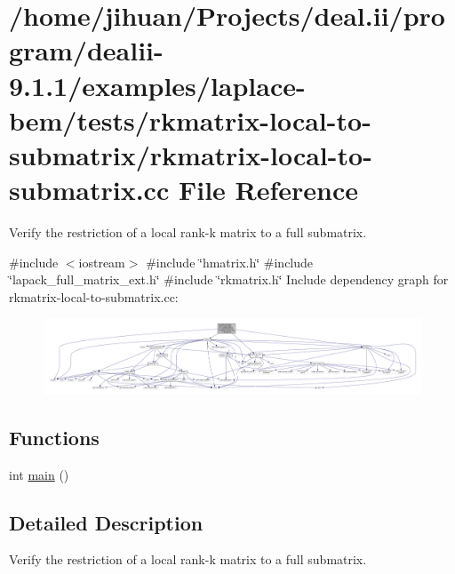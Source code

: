 \hypertarget{rkmatrix-local-to-submatrix_8cc}{}\section{/home/jihuan/\+Projects/deal.ii/program/dealii-\/9.1.1/examples/laplace-\/bem/tests/rkmatrix-\/local-\/to-\/submatrix/rkmatrix-\/local-\/to-\/submatrix.cc File Reference}
\label{rkmatrix-local-to-submatrix_8cc}


Verify the restriction of a local rank-\/k matrix to a full submatrix.  


{\ttfamily \#include $<$iostream$>$}\newline
{\ttfamily \#include \char`\"{}hmatrix.\+h\char`\"{}}\newline
{\ttfamily \#include \char`\"{}lapack\+\_\+full\+\_\+matrix\+\_\+ext.\+h\char`\"{}}\newline
{\ttfamily \#include \char`\"{}rkmatrix.\+h\char`\"{}}\newline
Include dependency graph for rkmatrix-\/local-\/to-\/submatrix.cc\+:
\nopagebreak
\begin{figure}[H]
\begin{center}
\leavevmode
\includegraphics[width=350pt]{rkmatrix-local-to-submatrix_8cc__incl}
\end{center}
\end{figure}
\subsection*{Functions}
\begin{DoxyCompactItemize}
\item 
int \hyperlink{rkmatrix-local-to-submatrix_8cc_ae66f6b31b5ad750f1fe042a706a4e3d4}{main} ()
\end{DoxyCompactItemize}


\subsection{Detailed Description}
Verify the restriction of a local rank-\/k matrix to a full submatrix. 

